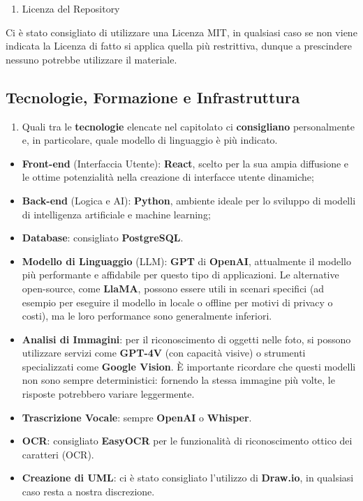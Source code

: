     \begin{enumerate}[resume*, itemsep=0pt, parsep=1pt, leftmargin=*, label=\arabic*.]
        \item Licenza del Repository
    \end{enumerate} \vspace{-0.5em}
    Ci è stato consigliato di utilizzare una Licenza MIT, in qualsiasi caso se non viene indicata la Licenza di fatto si applica quella più restrittiva, dunque a prescindere nessuno potrebbe utilizzare il materiale.

\subsection{Tecnologie, Formazione e Infrastruttura}
    \begin{enumerate}[resume*, itemsep=0pt, parsep=1pt, leftmargin=*, label=\arabic*.]
        \item Quali tra le \textbf{tecnologie} elencate nel capitolato ci \textbf{consigliano} personalmente e, in particolare, quale modello di linguaggio è più indicato.
    \end{enumerate} 
    \begin{itemize}[itemsep=0pt, parsep=1pt, label=--]
        \item \textbf{Front-end} (Interfaccia Utente): \textbf{React}, scelto per la sua ampia diffusione e le ottime potenzialità nella creazione di interfacce utente dinamiche;
        \item \textbf{Back-end} (Logica e AI): \textbf{Python}, ambiente ideale per lo sviluppo di modelli di intelligenza artificiale e machine learning;
        \item \textbf{Database}: consigliato \textbf{PostgreSQL}.
        \item \textbf{Modello di Linguaggio} (LLM): \textbf{GPT} di \textbf{OpenAI}, attualmente il modello più performante e affidabile per questo tipo di applicazioni. Le alternative open-source, come \textbf{LlaMA}, possono essere utili in scenari specifici (ad esempio per eseguire il modello in locale o offline per motivi di privacy o costi), ma le loro performance sono generalmente inferiori.
        \item \textbf{Analisi di Immagini}: per il riconoscimento di oggetti nelle foto, si possono utilizzare servizi come \textbf{GPT-4V} (con capacità visive) o strumenti specializzati come \textbf{Google Vision}. È importante ricordare che questi modelli non sono sempre deterministici: fornendo la stessa immagine più volte, le risposte potrebbero variare leggermente.
        \item \textbf{Trascrizione Vocale}: sempre \textbf{OpenAI} o \textbf{Whisper}. 
        \item \textbf{OCR}: consigliato \textbf{EasyOCR} per le funzionalità di riconoscimento ottico dei caratteri (OCR).
        \item \textbf{Creazione di UML}: ci è stato consigliato l'utilizzo di \textbf{Draw.io}, in qualsiasi caso resta a nostra discrezione.
    \end{itemize}

